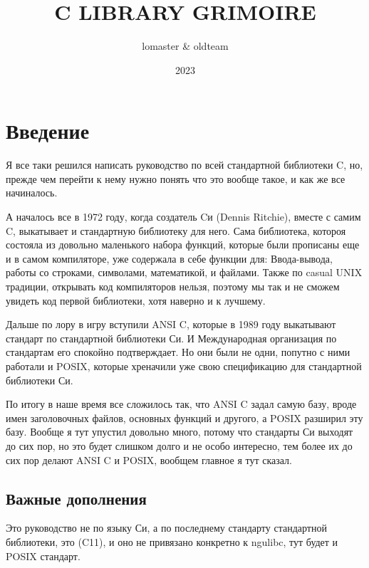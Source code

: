 \documentclass[12pt, letterpaper]{article}
\title{C LIBRARY GRIMOIRE}
\author{lomaster \& oldteam}
\date{2023}
\begin{document}
\maketitle
\newpage
\tableofcontents
\newpage

\section{Введение}
Я все таки решился написать руководство по всей стандартной библиотеки C, но, прежде чем перейти к нему нужно понять что это вообще такое, и как же все начиналось.

А началось все в 1972 году, когда создатель Cи (Dennis Ritchie), вместе с самим C, выкатывает и стандартную библиотеку для него.
Сама библиотека, котороя состояла из довольно маленького набора функций, которые были прописаны еще и в самом компиляторе, уже содержала в себе функции для: Ввода-вывода,
работы со строками, символами, математикой, и файлами. Также по casual UNIX традиции, открывать код компиляторов нельзя, поэтому мы так и не сможем увидеть код первой библиотеки,
хотя наверно и к лучшему.

Дальше по лору в игру вступили ANSI C, которые в 1989 году выкатывают стандарт по стандартной библиотеки Си. И Международная организация по стандартам его спокойно подтверждает.
Но они были не одни, попутно с ними работали и POSIX, которые хреначили уже свою спецификацию для стандартной библиотеки Си.

По итогу в наше время все сложилось так, что ANSI C задал самую базу, вроде имен заголовочных файлов, основных функций и другого, а POSIX разширил эту базу. Вообще я тут упустил довольно много,
потому что стандарты Си выходят до сих пор, но это будет слишком долго и не особо интересно, тем более их до сих пор делают ANSI C и POSIX, вообщем главное я тут сказал.

\subsection{Важные дополнения}
Это руководство не по языку Си, а по последнему стандарту стандартной библиотеки, это (C11), и оно не привязано конкретно к ngulibc,
тут будет и POSIX стандарт.
\end{document}
